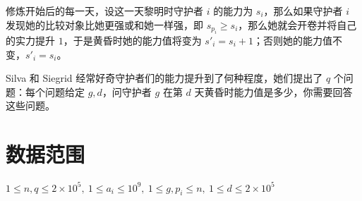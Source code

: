 \documentclass[a4paper,10pt]{article}
\begin{document}
修炼开始后的每一天，设这一天黎明时守护者 $i$ 的能力为 $s_i$，那么如果守护者 $i$ 发现她的比较对象比她更强或和她一样强，即 $s_{p_i}\ge s_i$，那么她就会开卷并将自己的实力提升 $1$，于是黄昏时她的能力值将变为 $s'_i=s_i+1$；否则她的能力值不变，$s'_i=s_i$。

Silva 和 Siegrid 经常好奇守护者们的能力提升到了何种程度，她们提出了 $q$ 个问题：每个问题给定 $g,d$，问守护者 $g$ 在第 $d$ 天黄昏时能力值是多少，你需要回答这些问题。

\section*{数据范围}

$1\leq n,q\leq 2\times 10^5,\ 1\leq a_i\leq 10^9,\ 1\leq g,p_i\leq n,\ 1\leq d\leq 2\times 10^5$
\end{document}
